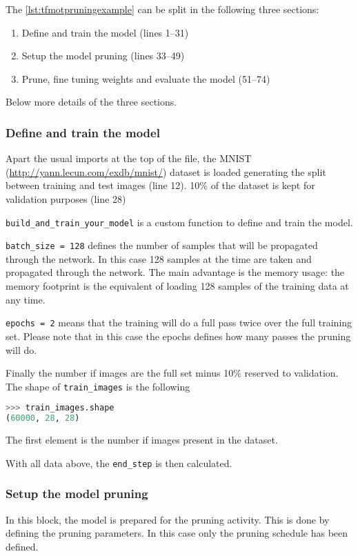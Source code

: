 The \autoref{lst:tfmotpruningexample} can be split in the following three
sections:

\begin{enumerate}
    \item Define and train the model (lines 1--31)
    \item Setup the model pruning (lines 33--49)
    \item Prune, fine tuning weights and evaluate the model (51--74)
\end{enumerate}

Below more details of the three sections.

\subsubsection{Define and train the model}
Apart the usual imports at the top of the file, the MNIST
(\url{http://yann.lecun.com/exdb/mnist/}) dataset is loaded generating the
split between training and test images (line 12).
10\% of the dataset is kept for validation purposes (line 28)

\texttt{build\_and\_train\_your\_model} is a custom function to define and
train the model.

\texttt{batch\_size = 128} defines the number of samples that will be
propagated through the network. In this case 128 samples at the time are taken
and propagated through the network.
The main advantage is the memory usage: the memory footprint is the equivalent
of loading 128 samples of the training data at any time.

\texttt{epochs = 2} means that the training will do a full pass twice over the
full training set. Please note that in this case the epochs defines how many
passes the pruning will do.

Finally the number if images are the full set minus 10\% reserved to
validation. The shape of \texttt{train\_images} is the following

\begin{lstlisting}[language=Python, caption=Shape of train\_images]
>>> train_images.shape
(60000, 28, 28)
\end{lstlisting}

The first element is the number if images present in the dataset.

With all data above, the \texttt{end\_step} is then calculated.

\subsubsection{Setup the model pruning}
In this block, the model is prepared for the pruning activity.
This is done by defining the pruning parameters. In this case only the pruning
schedule has been defined.

